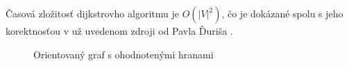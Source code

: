 Časová zložitosť dijkstrovho algoritmu je $O(|V|^{2})$, čo je dokázané spolu s jeho korektnosťou v už uvedenom zdroji od Pavla Ďuriša \cite[kapitola 2.2.1]{duris2009}.\newline

\begin{figure}[H]
  \caption{Orientovaný graf s ohodnotenými hranami}
  \label{dijkstra_priklad}
\end{figure}


